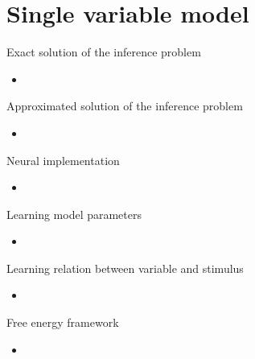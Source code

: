 \documentclass[aspectratio=43]{beamer}
\begin{document}
\section{Single variable model}
\begin{frame}{Exact solution of the inference problem}
  \begin{itemize}
    \item %
  \end{itemize}
\end{frame}


\begin{frame}{Approximated solution of the inference problem}
  \begin{itemize}
    \item %
  \end{itemize}
\end{frame}


\begin{frame}{Neural implementation}
  \begin{itemize}
    \item %
  \end{itemize}
\end{frame}


\begin{frame}{Learning model parameters}
  \begin{itemize}
    \item %
  \end{itemize}
\end{frame}

\begin{frame}{Learning relation between variable and stimulus}
  \begin{itemize}
    \item %
  \end{itemize}
\end{frame}

\begin{frame}{Free energy framework}
  \begin{itemize}
    \item %
  \end{itemize}
\end{frame}
\end{document}
